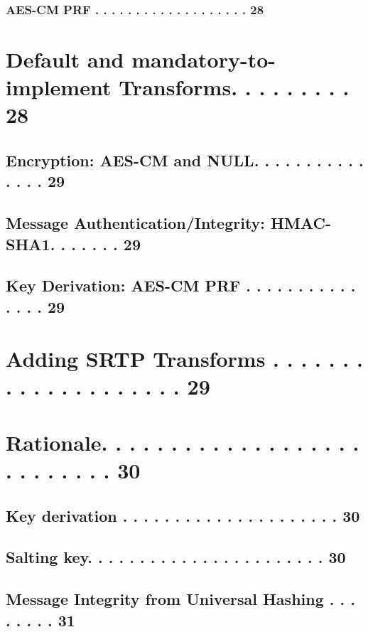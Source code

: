 \documentclass{article}
\begin{document}
\subsubsection{AES-CM PRF . . . . . . . . . . . . . . . . . . . 28}

\section{Default and mandatory-to-implement Transforms. . . . . . . . . 28}

\subsection{Encryption: AES-CM and NULL. . . . . . . . . . . . . . . 29}

\subsection{Message Authentication/Integrity: HMAC-SHA1. . . . . . . 29}

\subsection{Key Derivation: AES-CM PRF . . . . . . . . . . . . . . . 29}

\section{Adding SRTP Transforms . . . . . . . . . . . . . . . . . . . . 29}

\section{Rationale. . . . . . . . . . . . . . . . . . . . . . . . . . . 30}

\subsection{Key derivation . . . . . . . . . . . . . . . . . . . . . 30}

\subsection{Salting key. . . . . . . . . . . . . . . . . . . . . . . 30}

\subsection{Message Integrity from Universal Hashing . . . . . . . . 31}
\end{document}

